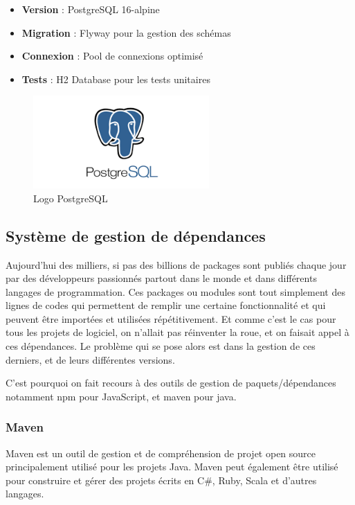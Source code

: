 \documentclass[12pt,a4paper]{report}
\begin{document}
\begin{itemize}
\item \textbf{Version} : PostgreSQL 16-alpine
\item \textbf{Migration} : Flyway pour la gestion des schémas
\item \textbf{Connexion} : Pool de connexions optimisé
\item \textbf{Tests} : H2 Database pour les tests unitaires
\end{itemize}

\begin{figure}[H]
\centering
\includegraphics[width=0.6\textwidth]{latex_media/media/image26.png}
\caption{Logo PostgreSQL}
\label{fig:logo-postgresql}
\end{figure}

\subsection{Système de gestion de dépendances}

Aujourd'hui des milliers, si pas des billions de packages sont publiés chaque jour par des développeurs passionnés partout dans le monde et dans différents langages de programmation. Ces packages ou modules sont tout simplement des lignes de codes qui permettent de remplir une certaine fonctionnalité et qui peuvent être importées et utilisées répétitivement. Et comme c'est le cas pour tous les projets de logiciel, on n'allait pas réinventer la roue, et on faisait appel à ces dépendances. Le problème qui se pose alors est dans la gestion de ces derniers, et de leurs différentes versions.

C'est pourquoi on fait recours à des outils de gestion de paquets/dépendances notamment npm pour JavaScript, et maven pour java.

\subsubsection{Maven}

Maven est un outil de gestion et de compréhension de projet open source principalement utilisé pour les projets Java. Maven peut également être utilisé pour construire et gérer des projets écrits en C\#, Ruby, Scala et d'autres langages.
\end{document}

